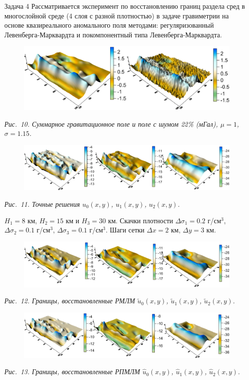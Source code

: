 \documentclass[10pt,pdf, mathserif, hyperref={unicode}]{beamer}
\begin{document}
\begin{frame}{Задача 4}
	Рассматривается эксперимент по восстановлению границ раздела сред в многослойной среде (4 слоя с разной плотностью) в задаче гравиметрии на основе квазиреального аномального поля методами: регуляризованный Левенберга-Марквардта и покомпонентный типа Левенберга-Марквардта.
	\begin{figure}
		\centering
		\includegraphics[height=0.3\textheight]{fields}
	\end{figure}
	\centering\textit{Рис.~10. Суммарное гравитационное поле и поле с шумом 22\% (мГал), $\mu=1$, $\sigma=1.15$.}
	\begin{figure}
		\centering
		\includegraphics[height=0.2\textheight]{exact_hor}
	\end{figure}
	\centering\textit{Рис.~11. Точные решения $u_0(x,y)$, $u_1(x,y)$, $u_2(x,y)$.}
	
	$H_1=8$ км, $H_2=15$ км и $H_3=30$ км. Скачки плотности $\Delta\sigma_1=0.2$ г/см$^3$, $\Delta\sigma_2=0.1$ г/см$^3$, $\Delta\sigma_3=0.1$ г/см$^3$. Шаги сетки $\Delta x=2$ км, $\Delta y=3$ км.
\end{frame}
\begin{frame}
	\begin{figure}
		\centering
		\includegraphics[height=0.2\textheight]{levmar}
	\end{figure}
	\centering\textit{Рис.~12. Границы, восстановленные РМЛМ $\tilde{u}_0(x,y)$, $\tilde{u}_1(x,y)$, $\tilde{u}_2(x,y)$.}
	\begin{figure}
		\centering
		\includegraphics[height=0.2\textheight]{clm}
	\end{figure}
	\centering\textit{Рис.~13. Границы, восстановленные РПМЛМ $\hat{u}_0(x,y)$, $\hat{u}_1(x,y)$, $\hat{u}_2(x,y)$.}
\end{frame}
\end{document}
